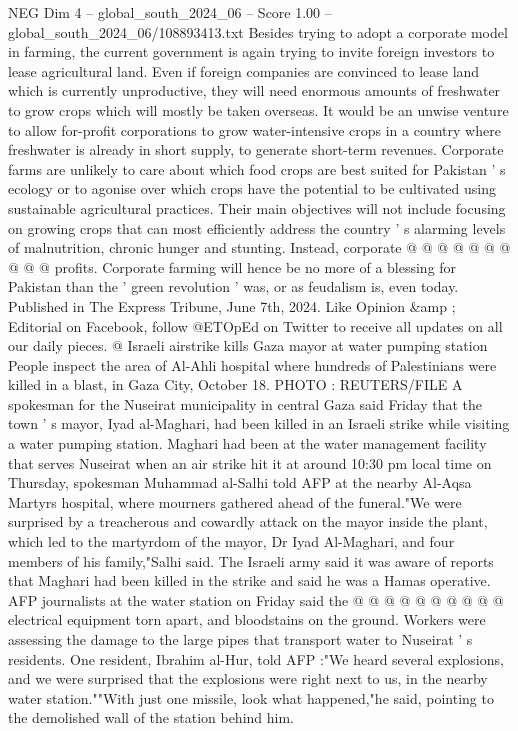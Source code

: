 \begin{textsample}{NEG Dim 4 – global\_south\_2024\_06 – Score 1.00 – global\_south\_2024\_06/108893413.txt}
Besides trying to adopt a corporate model in farming, the current government is again trying to invite foreign investors to lease agricultural land.
Even if foreign companies are convinced to lease land which is currently unproductive, they will need enormous amounts of freshwater to grow crops which will mostly be taken overseas.
It would be an unwise venture to allow for-profit corporations to grow water-intensive crops in a country where freshwater is already in short supply, to generate short-term revenues.
Corporate farms are unlikely to care about which food crops are best suited for Pakistan ' s ecology or to agonise over which crops have the potential to be cultivated using sustainable agricultural practices.
Their main objectives will not include focusing on growing crops that can most efficiently address the country ' s alarming levels of malnutrition, chronic hunger and stunting.
Instead, corporate @ @ @ @ @ @ @ @ @ @ profits.
Corporate farming will hence be no more of a blessing for Pakistan than the ' green revolution ' was, or as feudalism is, even today.
Published in The Express Tribune, June 7th, 2024.
Like Opinion \&amp ; Editorial on Facebook, follow @ETOpEd on Twitter to receive all updates on all our daily pieces. @ Israeli airstrike kills Gaza mayor at water pumping station People inspect the area of Al-Ahli hospital where hundreds of Palestinians were killed in a blast, in Gaza City, October 18.
PHOTO : REUTERS/FILE A spokesman for the Nuseirat municipality in central Gaza said Friday that the town ' s mayor, Iyad al-Maghari, had been killed in an Israeli strike while visiting a water pumping station.
Maghari had been at the water management facility that serves Nuseirat when an air strike hit it at around 10:30 pm local time on Thursday, spokesman Muhammad al-Salhi told AFP at the nearby Al-Aqsa Martyrs hospital, where mourners gathered ahead of the funeral."We were surprised by a treacherous and cowardly attack on the mayor inside the plant, which led to the martyrdom of the mayor, Dr Iyad Al-Maghari, and four members of his family,"Salhi said.
The Israeli army said it was aware of reports that Maghari had been killed in the strike and said he was a Hamas operative.
AFP journalists at the water station on Friday said the @ @ @ @ @ @ @ @ @ @ electrical equipment torn apart, and bloodstains on the ground.
Workers were assessing the damage to the large pipes that transport water to Nuseirat ' s residents.
One resident, Ibrahim al-Hur, told AFP :"We heard several explosions, and we were surprised that the explosions were right next to us, in the nearby water station.""With just one missile, look what happened,"he said, pointing to the demolished wall of the station behind him.

\end{textsample}
